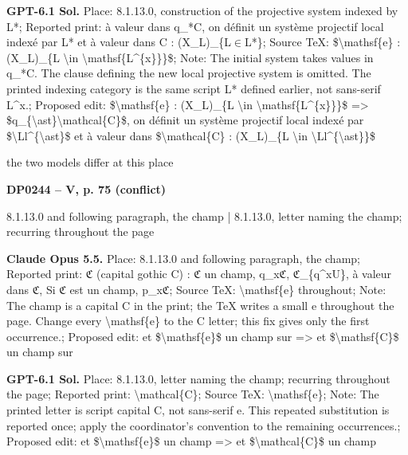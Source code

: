 \textbf{GPT-6.1 Sol.} Place: 8.1.13.0, construction of the projective system indexed by L*; Reported print: à valeur dans q\_*C, on définit un système projectif local indexé par L* et à valeur dans C : (X\_L)\_\{L\ensuremath{\in}L*\}; Source TeX: \$\textbackslash{}mathsf\{e\} : (X\_L)\_\{L \textbackslash{}in \textbackslash{}mathsf\{L\textasciicircum{}\{x\}\}\}\$; Note: The initial system takes values in q\_*C. The clause defining the new local projective system is omitted. The printed indexing category is the same script L* defined earlier, not sans-serif L\textasciicircum{}x.; Proposed edit: \$\textbackslash{}mathsf\{e\} : (X\_L)\_\{L \textbackslash{}in \textbackslash{}mathsf\{L\textasciicircum{}\{x\}\}\}\$ =\allowbreak > \$q\_\{\textbackslash{}ast\}\textbackslash{}mathcal\{C\}\$, on définit un système projectif local indexé par \$\textbackslash{}Ll\textasciicircum{}\{\textbackslash{}ast\}\$ et à valeur dans \$\textbackslash{}mathcal\{C\} : (X\_L)\_\{L \textbackslash{}in \textbackslash{}Ll\textasciicircum{}\{\textbackslash{}ast\}\}\$\par
the two models differ at this place\par
\par\noindent\hypertarget{DP0244}{}\textbf{DP0244 -- V, p. 75 (conflict)}\par
8.1.13.0 and following paragraph, the champ | 8.1.13.0, letter naming the champ; recurring throughout the page\par
\textbf{Claude Opus 5.5.} Place: 8.1.13.0 and following paragraph, the champ; Reported print: \ensuremath{\mathfrak{C}} (capital gothic C) : \ensuremath{\mathfrak{C}} un champ, q\_x\ensuremath{\mathfrak{C}}, \ensuremath{\mathfrak{C}}\_\{q\textasciicircum{}xU\}, à valeur dans \ensuremath{\mathfrak{C}}, Si \ensuremath{\mathfrak{C}} est un champ, p\_x\ensuremath{\mathfrak{C}}; Source TeX: \textbackslash{}mathsf\{e\} throughout; Note: The champ is a capital C in the print; the TeX writes a small e throughout the page. Change every \textbackslash{}mathsf\{e\} to the C letter; this fix gives only the first occurrence.; Proposed edit: et \$\textbackslash{}mathsf\{e\}\$ un champ sur =\allowbreak > et \$\textbackslash{}mathsf\{C\}\$ un champ sur\par
\textbf{GPT-6.1 Sol.} Place: 8.1.13.0, letter naming the champ; recurring throughout the page; Reported print: \textbackslash{}mathcal\{C\}; Source TeX: \textbackslash{}mathsf\{e\}; Note: The printed letter is script capital C, not sans-serif e. This repeated substitution is reported once; apply the coordinator's convention to the remaining occurrences.; Proposed edit: et \$\textbackslash{}mathsf\{e\}\$ un champ =\allowbreak > et \$\textbackslash{}mathcal\{C\}\$ un champ\par
